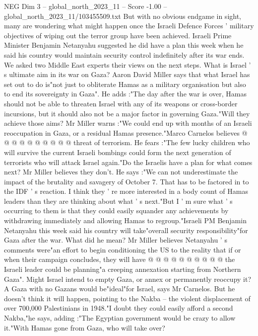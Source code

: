 \begin{textsample}{NEG Dim 3 – global\_north\_2023\_11 – Score -1.00 – global\_north\_2023\_11/103455509.txt}  \label{ex:f3_neg_272}
But with no obvious endgame in sight, many are wondering what might happen once the Israeli Defence Forces ' military objectives of wiping out the terror group have been achieved.
Israeli Prime Minister Benjamin Netanyahu suggested he did have a plan this week when he said his country would maintain security control indefinitely after its war ends.
We asked two Middle East experts their views on the next steps.
What is Israel ' s ultimate aim in its war on Gaza?
Aaron David Miller says that what Israel has set out to do is"not just to obliterate Hamas as a military organisation but also to end its sovereignty in Gaza".
He adds :"The day after the war is over, Hamas should not be able to threaten Israel with any of its weapons or cross-border incursions, but it should also not be a major factor in governing Gaza."Will they achieve those aims?
Mr Miller warns :"We could end up with months of an Israeli reoccupation in Gaza, or a residual Hamas presence."Marco Carnelos believes @ @ @ @ @ @ @ @ @ @ threat of terrorism.
He fears :"The few lucky children who will survive the current Israeli bombings could form the next generation of terrorists who will attack Israel again."Do the Israelis have a plan for what comes next?
Mr Miller believes they don't.
He says :"We can not underestimate the impact of the brutality and savagery of October 7.
That has to be factored in to the IDF ' s reaction.
I think they ' re more interested in a body count of Hamas leaders than they are thinking about what ' s next."But I ' m sure what ' s occurring to them is that they could easily squander any achievements by withdrawing immediately and allowing Hamas to regroup."Israeli PM Benjamin Netanyahu this week said his country will take"overall security responsibility"for Gaza after the war.
What did he mean?
Mr Miller believes Netanyahu ' s comments were"an effort to begin conditioning the US to the reality that if or when their campaign concludes, they will have @ @ @ @ @ @ @ @ @ @ the Israeli leader could be planning"a creeping annexation starting from Northern Gaza".
Might Israel intend to empty Gaza, or annex or permanently reoccupy it?
A Gaza with no Gazans would be"ideal"for Israel, says Mr Carnelos.
But he doesn't think it will happen, pointing to the Nakba -- the violent displacement of over 700,000 Palestinians in 1948."I doubt they could easily afford a second Nakba,"he says, adding :"The Egyptian government would be crazy to allow it."With Hamas gone from Gaza, who will take over?

\end{textsample}
